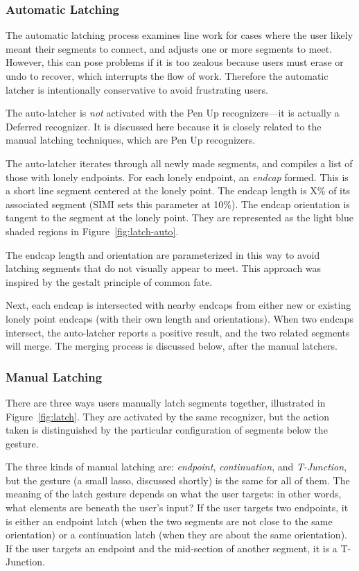 \subsubsection{Automatic Latching}

The automatic latching process examines line work for cases where the
user likely meant their segments to connect, and adjusts one or more
segments to meet. However, this can pose problems if it is too zealous
because users must erase or undo to recover, which interrupts the flow
of work. Therefore the automatic latcher is intentionally conservative
to avoid frustrating users.

The auto-latcher is \textit{not} activated with the Pen Up
recognizers---it is actually a Deferred recognizer. It is discussed
here because it is closely related to the manual latching techniques,
which are Pen Up recognizers.

The auto-latcher iterates through all newly made segments, and
compiles a list of those with lonely endpoints. For each lonely
endpoint, an \textit{endcap} formed. This is a short line segment
centered at the lonely point. The endcap length is X\% of its
associated segment (SIMI sets this parameter at 10\%). The endcap
orientation is tangent to the segment at the lonely point. They are
represented as the light blue shaded regions in
Figure~\ref{fig:latch-auto}.

The endcap length and orientation are parameterized in this way to
avoid latching segments that do not visually appear to meet. This
approach was inspired by the gestalt principle of common fate.

Next, each endcap is intersected with nearby endcaps from either new
or existing lonely point endcaps (with their own length and
orientations). When two endcaps intersect, the auto-latcher reports a
positive result, and the two related segments will merge. The merging
process is discussed below, after the manual latchers.

\subsubsection{Manual Latching}

There are three ways users manually latch segments together,
illustrated in Figure~\ref{fig:latch}. They are activated by the same
recognizer, but the action taken is distinguished by the particular
configuration of segments below the gesture.

The three kinds of manual latching are: \textit{endpoint},
\textit{continuation}, and \textit{T-Junction}, but the gesture (a
small lasso, discussed shortly) is the same for all of them. The
meaning of the latch gesture depends on what the user targets: in
other words, what elements are beneath the user's input? If the user
targets two endpoints, it is either an endpoint latch (when the two
segments are not close to the same orientation) or a continuation
latch (when they are about the same orientation). If the user targets
an endpoint and the mid-section of another segment, it is a
T-Junction.

